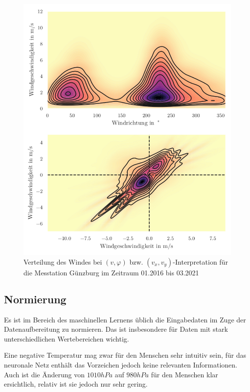 \documentclass[
12pt, %
toc=listofnumbered, %
toc=chapterentrydotfill, %
numbers=noenddot, %
captions=tableheading, %
bibliography=numbered
]{scrreprt}
\let\Oldsubsection\subsection
\renewcommand{\subsection}{\FloatBarrier\Oldsubsection}
\begin{document}
\begin{figure}[tph]
	\begin{center}
		\includegraphics[scale = 1]{./images/pol2cart.png}
		\caption{Verteilung des Windes bei $(v,\varphi)$ bzw. $(v_x,v_y)$-Interpretation für die Messtation Günzburg im Zeitraum 01.2016 bis 03.2021}
		\label{fig:pol2cart2}
	\end{center}
\end{figure}

\subsection{Normierung}

Es ist im Bereich des maschinellen Lernens üblich die Eingabedaten im Zuge der Datenaufbereitung zu normieren. Das ist insbesondere für Daten mit stark unterschiedlichen Wertebereichen wichtig. 

Eine negative Temperatur mag zwar für den Menschen sehr intuitiv sein, für das neuronale Netz enthält das Vorzeichen jedoch keine relevanten Informationen. Auch ist die Änderung von $1010 hPa$ auf $980 hPa$ für den Menschen klar ersichtlich, relativ ist sie jedoch nur sehr gering. 
\end{document}
